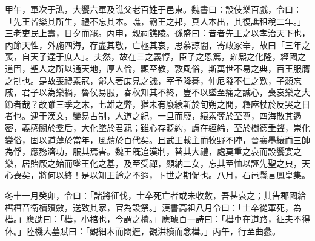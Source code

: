 \begin{pinyinscope}
甲午，軍次于譙，大饗六軍及譙父老百姓于邑東。魏書曰：設伎樂百戲，令曰：「先王皆樂其所生，禮不忘其本。譙，霸王之邦，真人本出，其復譙租稅二年。」三老吏民上壽，日夕而罷。丙申，親祠譙陵。孫盛曰：昔者先王之以孝治天下也，內節天性，外施四海，存盡其敬，亡極其哀，思慕諒闇，寄政冢宰，故曰「三年之喪，自天子達于庶人」。夫然，故在三之義惇，臣子之恩篤，雍熈之化隆，經國之道固，聖人之所以通天地，厚人倫，顯至教，敦風俗，斯萬世不易之典，百王服膺之制也。是故喪禮素冠，鄶人著庶見之譏，宰予降朞，仲尼發不仁之歎，子頹忘戚，君子以為樂禍，魯侯易服，春秋知其不終，豈不以墜至痛之誠心，喪哀樂之大節者哉？故雖三季之末，七雄之弊，猶未有廢縗斬於旬朔之閒，釋麻杖於反哭之日者也。逮于漢文，變易古制，人道之紀，一旦而廢，縗素奪於至尊，四海散其遏密，義感闕於羣后，大化墜於君親；雖心存貶約，慮在經綸，至於樹德垂聲，崇化變俗，固以道薄於當年，風穨於百代矣。且武王載主而牧野不陣，晉襄墨縗而三帥為俘，應務濟功，服其焉害。魏王旣追漢制，替其大禮，處莫重之哀而設饗宴之樂，居貽厥之始而墜王化之基，及至受禪，顯納二女，忘其至恤以誣先聖之典，天心喪矣，將何以終！是以知王齡之不遐，卜世之期促也。八月，石邑縣言鳳皇集。

冬十一月癸卯，令曰：「諸將征伐，士卒死亡者或未收斂，吾甚哀之；其告郡國給槥槥音衞櫝殯斂，送致其家，官為設祭。」漢書高祖八月令曰：「士卒從軍死，為槥。」應劭曰：「槥，小棺也，今謂之櫝。」應璩百一詩曰：「槥車在道路，征夫不得休。」陸機大墓賦曰：「觀細木而悶遲，覩洪櫝而念槥。」丙午，行至曲蠡。


\end{pinyinscope}

